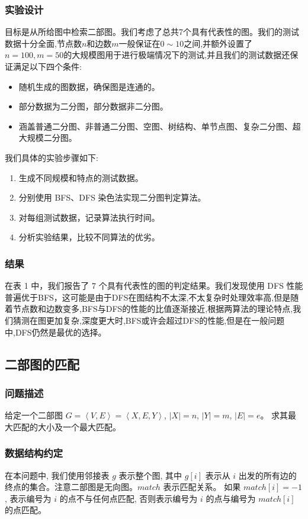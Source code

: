 \subsubsection{\textbf{\mbox{实验设计}}}
目标是从所给图中检索二部图。我们考虑了总共7个具有代表性的图。我们的测试数据十分全面,节点数$n$和边数$m$一般保证在$0\sim10$之间,并额外设置了$n=100,m=50$的大规模图用于进行极端情况下的测试,并且我们的测试数据还保证满足以下四个条件:
\begin{itemize}
	\item 随机生成的图数据，确保图是连通的。
	\item 部分数据为二分图，部分数据非二分图。
	\item 涵盖普通二分图、非普通二分图、空图、树结构、单节点图、复杂二分图、超大规模二分图。
\end{itemize}
我们具体的实验步骤如下:
\begin{enumerate}
	\item 生成不同规模和特点的测试数据。
	\item 分别使用 BFS、DFS 染色法实现二分图判定算法。
	\item 对每组测试数据，记录算法执行时间。
	\item 分析实验结果，比较不同算法的优劣。
\end{enumerate}

\subsubsection{\textbf{\mbox{结果}}}
在表 1 中，我们报告了 7 个具有代表性的图的判定结果。我们发现使用 DFS 性能普遍优于BFS，这可能是由于DFS在图结构不太深,不太复杂时处理效率高,但是随着节点数和边数变多,BFS与DFS的性能的比值逐渐接近,根据两算法的理论特点,我们猜测在图更加复杂,深度更大时,BFS或许会超过DFS的性能,但是在一般问题中,DFS仍然是最优的选择。

\subsection{\textbf{\mbox{二部图的匹配}}}
\subsubsection{问题描述}
给定一个二部图 $G = \left<V, E\right> = \left<X, E, Y\right>$, $\left|X\right| = n$, $\left|Y\right| = m$, $\left|E\right| = e$。 求其最大匹配的大小及一个最大匹配。
\subsubsection{数据结构约定}
在本问题中, 我们使用邻接表 $g$ 表示整个图, 其中 $g[i]$ 表示从 $i$ 出发的所有边的终点的集合。注意二部图是无向图。$match$ 表示匹配关系。
如果 $match[i] = -1$, 表示编号为 $i$ 的点不与任何点匹配, 否则表示编号为 $i$ 的点与编号为 $match[i]$ 的点匹配。

